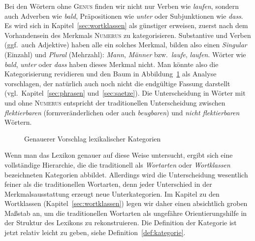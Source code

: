 
Bei den Wörtern ohne \textsc{Genus} finden wir nicht nur Verben wie \textit{laufen}, sondern auch Adverben wie \textit{bald}, Präpositionen wie \textit{unter} oder Subjunktionen wie \textit{dass}.
Es wird sich in Kapitel~\ref{sec:wortklassen} als günstiger erweisen, zuerst nach dem Vorhandensein des Merkmals \textsc{Numerus} zu kategorisieren.
Substantive und Verben (ggf.\ auch Adjektive) haben alle ein solches Merkmal, bilden also einen \textit{Singular} (Einzahl) und \textit{Plural} (Mehrzahl): \textit{Mann}, \textit{Männer} bzw.\ \textit{laufe}, \textit{laufen}.
Wörter wie \textit{bald}, \textit{unter} oder \textit{dass} haben dieses Merkmal nicht.
Man könnte also die Kategorisierung revidieren und den Baum in Abbildung~\ref{fig:kategorien003} als Analyse vorschlagen, der natürlich auch noch nicht die endgültige Fassung darstellt (vgl.\ Kapitel~\ref{sec:phrasen} und~\ref{sec:saetze}).
Die Unterscheidung in Wörter mit und ohne \textsc{Numerus} entspricht der traditionellen Unterscheidung zwischen \textit{flektierbaren} (formveränderlichen oder auch \textit{beugbaren}) und \textit{nicht flektierbaren} Wörtern.

\begin{figure}[!htbp]
\centering
  \caption{Genauerer Vorschlag lexikalischer Kategorien}
  \label{fig:kategorien003}
\end{figure}


Wenn man das Lexikon genauer auf diese Weise untersucht, ergibt sich eine vollständige Hierarchie, die die traditionell als \textit{Wortarten} oder \textit{Wortklassen} bezeichneten Kategorien abbildet.
Allerdings wird die Unterscheidung wesentlich feiner als die traditionellen Wortarten, denn jeder Unterschied in der Merkmalsausstattung erzeugt neue Unterkategorien.
Im Kapitel zu den Wortklassen (Kapitel~\ref{sec:wortklassen}) legen wir daher einen absichtlich groben Maßstab an, um die traditionellen Wortarten als ungefähre Orientierungshilfe in der Struktur des Lexikons zu rekonstruieren.
Die Definition der Kategorie ist jetzt relativ leicht zu geben, siehe Definition~\ref{def:kategorie}.



